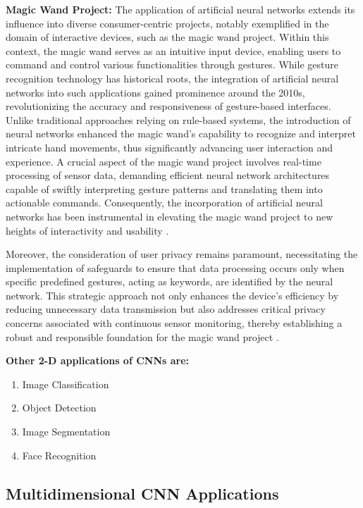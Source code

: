 \textbf{Magic Wand Project:} The application of artificial neural networks extends its influence into diverse consumer-centric projects, notably exemplified in the domain of interactive devices, such as the magic wand project. Within this context, the magic wand serves as an intuitive input device, enabling users to command and control various functionalities through gestures. While gesture recognition technology has historical roots, the integration of artificial neural networks into such applications gained prominence around the 2010s, revolutionizing the accuracy and responsiveness of gesture-based interfaces. Unlike traditional approaches relying on rule-based systems, the introduction of neural networks enhanced the magic wand's capability to recognize and interpret intricate hand movements, thus significantly advancing user interaction and experience. A crucial aspect of the magic wand project involves real-time processing of sensor data, demanding efficient neural network architectures capable of swiftly interpreting gesture patterns and translating them into actionable commands. Consequently, the incorporation of artificial neural networks has been instrumental in elevating the magic wand project to new heights of interactivity and usability \cite{Set:2023}. 

Moreover, the consideration of user privacy remains paramount, necessitating the implementation of safeguards to ensure that data processing occurs only when specific predefined gestures, acting as keywords, are identified by the neural network. This strategic approach not only enhances the device's efficiency by reducing unnecessary data transmission but also addresses critical privacy concerns associated with continuous sensor monitoring, thereby establishing a robust and responsible foundation for the magic wand project \cite{Set:2023}.

\textbf{Other 2-D applications of CNNs are:}

\begin{enumerate}
	\item Image Classification

	\item Object Detection
	
	\item Image Segmentation
	
	\item Face Recognition

\end{enumerate}

\subsection{Multidimensional CNN Applications}

